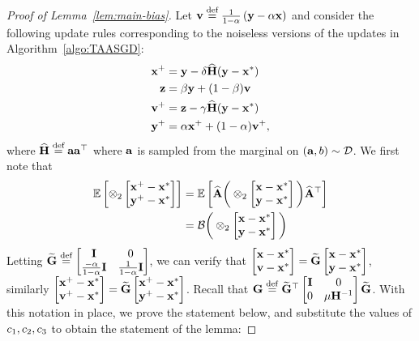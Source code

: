 \begin{proof}[Proof of Lemma~\ref{lem:main-bias}]
Let $\mathbf{v} \stackrel{\textrm{def}}{=} \frac{1}{1-\alpha}\left(\mathbf{y} - \alpha \mathbf{x}\right)$ and consider the following update rules corresponding to the noiseless versions of the updates in Algorithm~\ref{algo:TAASGD}:
\begin{align*}
	\mathbf{x}^+ &= \mathbf{y} - \delta \widehat{\mathbf{H}} (\mathbf{y}-\mathbf{x}^*) \\
	\mathbf{z} &= \beta \mathbf{y} + (1-\beta) \mathbf{v} \\
	\mathbf{v}^+ &= \mathbf{z} - \gamma \widehat{\mathbf{H}} (\mathbf{y}-\mathbf{x}^*) \\
	\mathbf{y}^+ &= \alpha \mathbf{x}^+ + (1-\alpha) \mathbf{v}^+,
\end{align*}
where $\widehat{\mathbf{H}} \stackrel{\textrm{def}}{=} \mathbf{a} \mathbf{a}^{\top}$ where $\mathbf{a}$ is sampled from the marginal on $(\mathbf{a},b)\sim \mathcal{D}$. We first note that 
\begin{align*}
\mathbb{E}\left[\otimes_2 \begin{bmatrix} \mathbf{x}^+-\mathbf{x}^* \\ \mathbf{y}^+-\mathbf{x}^* \end{bmatrix}\right] &= \mathbb{E}\left[\widehat{\mathbf{A}} \bigg(\otimes_2 \begin{bmatrix} \mathbf{x}-\mathbf{x}^* \\ \mathbf{y}-\mathbf{x}^* \end{bmatrix}\bigg)\widehat{\mathbf{A}}^{\top}\right] \\
&=\mathcal{B}\bigg(\otimes_2 \begin{bmatrix} \mathbf{x}-\mathbf{x}^* \\ \mathbf{y}-\mathbf{x}^* \end{bmatrix}\bigg) 
\end{align*}
Letting $\widetilde{\mathbf{G}} \stackrel{\textrm{def}}{=} \begin{bmatrix} \mathbf{I} &0 \\ \frac{-\alpha}{1-\alpha}\mathbf{I} & \frac{1}{1-\alpha}\mathbf{I} \end{bmatrix}$, we can verify that $\begin{bmatrix} \mathbf{x}-\mathbf{x}^* \\ \mathbf{v}-\mathbf{x}^* \end{bmatrix} = \widetilde{\mathbf{G}} \begin{bmatrix} \mathbf{x}-\mathbf{x}^* \\ \mathbf{y}-\mathbf{x}^* \end{bmatrix}$, similarly $\begin{bmatrix} \mathbf{x}^+-\mathbf{x}^* \\ \mathbf{v}^+-\mathbf{x}^* \end{bmatrix} = \widetilde{\mathbf{G}} \begin{bmatrix} \mathbf{x}^+-\mathbf{x}^* \\ \mathbf{y}^+-\mathbf{x}^* \end{bmatrix}$. Recall that $\mathbf{G} \stackrel{\mathrm{def}}{=} \widetilde{\mathbf{G}} ^{\top} \begin{bmatrix} \mathbf{I} &0 \\ 0 & {\mu}{\mathbf{H}}^{-1} \end{bmatrix} \widetilde{\mathbf{G}}$. With this notation in place, we prove the statement below, and substitute the values of $c_1,c_2,c_3$ to obtain the statement of the lemma:

\end{proof}
